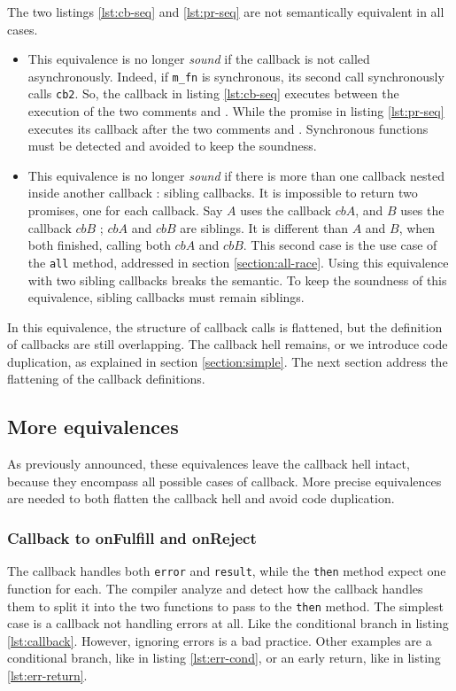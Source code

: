 The two listings \ref{lst:cb-seq} and \ref{lst:pr-seq} are not semantically equivalent in all cases.
\begin{itemize}
\item This equivalence is no longer \textit{sound} if the callback is not called asynchronously.
Indeed, if \texttt{m_fn} is synchronous, its second call synchronously calls \texttt{cb2}.
So, the callback in listing \ref{lst:cb-seq} executes between the execution of the two comments  and .
While the promise in listing \ref{lst:pr-seq} executes its callback after the two comments  and .
Synchronous functions must be detected and avoided to keep the soundness.
\item This equivalence is no longer \textit{sound} if there is more than one callback nested inside another callback : sibling callbacks.
It is impossible to return two promises, one for each callback.
Say $A$ uses the callback $cbA$, and $B$ uses the callback $cbB$ ; $cbA$ and $cbB$ are siblings.
It is different than $A$ and $B$, when both finished, calling both $cbA$ and $cbB$.
This second case is the use case of the \texttt{all} method, addressed in section \ref{section:all-race}.
Using this equivalence with two sibling callbacks breaks the semantic.
To keep the soundness of this equivalence, sibling callbacks must remain siblings.
\end{itemize}
In this equivalence, the structure of callback calls is flattened, but the definition of callbacks are still overlapping.
The callback hell remains, or we introduce code duplication, as explained in section \ref{section:simple}.
The next section address the flattening of the callback definitions.

\subsection{More equivalences} \label{section:more}

As previously announced, these equivalences leave the callback hell intact, because they encompass all possible cases of callback.
More precise equivalences are needed to both flatten the callback hell and avoid code duplication.

\subsubsection{Callback to onFulfill and onReject} \label{section:duplication}

The callback handles both \texttt{error} and \texttt{result}, while the \texttt{then} method expect one function for each.
The compiler analyze and detect how the callback handles them to split it into the two functions to pass to the \texttt{then} method.
The simplest case is a callback not handling errors at all.
Like the conditional branch in listing \ref{lst:callback}.
However, ignoring errors is a bad practice.
Other examples are a conditional branch, like in listing \ref{lst:err-cond}, or an early return, like in listing \ref{lst:err-return}.

